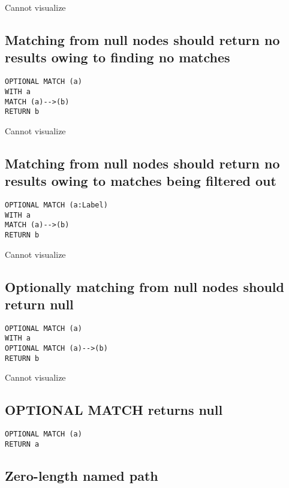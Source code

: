 Cannot visualize
\subsection{Matching from null nodes should return no results owing to finding no matches}

\begin{lstlisting}
OPTIONAL MATCH (a)
WITH a
MATCH (a)-->(b)
RETURN b
\end{lstlisting}

Cannot visualize
\subsection{Matching from null nodes should return no results owing to matches being filtered out}

\begin{lstlisting}
OPTIONAL MATCH (a:Label)
WITH a
MATCH (a)-->(b)
RETURN b
\end{lstlisting}

Cannot visualize
\subsection{Optionally matching from null nodes should return null}

\begin{lstlisting}
OPTIONAL MATCH (a)
WITH a
OPTIONAL MATCH (a)-->(b)
RETURN b
\end{lstlisting}

Cannot visualize
\subsection{OPTIONAL MATCH returns null}

\begin{lstlisting}
OPTIONAL MATCH (a)
RETURN a
\end{lstlisting}

\subsection{Zero-length named path}

